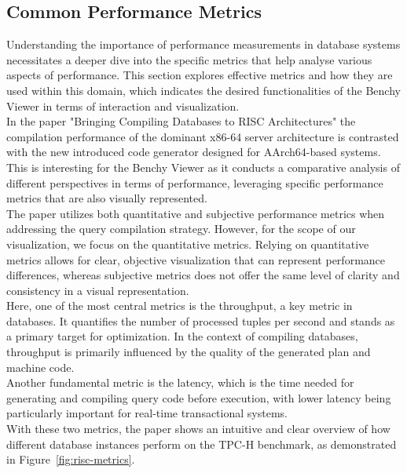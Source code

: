 \subsection{Common Performance Metrics}
Understanding the importance of performance measurements in database systems necessitates a deeper dive into the specific metrics that help analyse various aspects of performance. This section explores effective metrics and how they are used within this domain, which indicates the desired functionalities of the Benchy Viewer in terms of interaction and visualization.\\
In the paper "Bringing Compiling Databases to RISC Architectures" \cite{Bringin-Compiling-Databases-to-RISC} the compilation performance of the dominant x86-64 server architecture is contrasted  with the new introduced code generator designed for AArch64-based systems. This is interesting for the Benchy Viewer as it conducts a comparative analysis of different perspectives in terms of performance,  leveraging specific performance metrics that are also visually represented.\\ 
The paper utilizes both quantitative and subjective performance metrics when addressing the query compilation strategy. However, for the scope of our visualization, we focus on the quantitative metrics. Relying on quantitative metrics allows for clear, objective visualization that can represent performance differences, whereas subjective metrics does not offer the same level of clarity and consistency in a visual representation.\\
Here, one of the most central metrics is the throughput, a key metric in databases.  It quantifies the number of processed tuples per second and stands as a primary target for optimization. In the context of compiling databases, throughput is primarily influenced by the quality of the generated plan and machine code.\\
Another fundamental metric is the latency, which is the time needed for generating and compiling query code before execution, with lower latency being particularly important for real-time transactional systems.\\
With these two metrics, the paper shows an intuitive and clear overview of how different database instances perform on the TPC-H benchmark, as demonstrated in Figure~\ref{fig:risc-metrics}.

